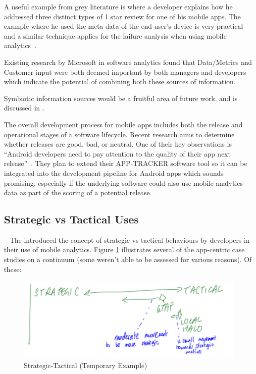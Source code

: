 A useful example from grey literature is where a developer explains how he addressed three distinct types of 1 star review for one of his mobile apps. The example where he used the meta-data of the end user's device is very practical and a similar technique applies for the failure analysis when using mobile analytics~.

Existing research by Microsoft in software analytics found that Data/Metrics and Customer input were both deemed important by both managers and developers which indicate the potential of combining both these sources of information.~

Symbiotic information sources would be a fruitful area of future work, and is discussed in .

The overall development process for mobile apps includes both the release and operational stages of a software lifecycle. Recent research aims to determine whether releases are good, bad, or neutral. One of their key observations is ``Android developers need to pay attention to the quality of their app next release''~. They plan to extend their \uppercase{App-Tracker} software tool so it can be integrated into the development pipeline for Android apps which sounds promising, especially if the underlying software could also use mobile analytics data as part of the scoring of a potential release.


\subsection{Strategic vs Tactical Uses}~\label{aiu-strategic-vs-tactical-uses-topic}
The  introduced the concept of strategic vs tactical behaviours by developers in their use of mobile analytics. Figure \ref{fig:aiu-strategic-tactical-example} illustrates several of the app-centric case studies on a continuum (some weren't able to be assessed for various reasons). Of these:

\begin{figure}
    \centering
    \includegraphics[width=\linewidth]{images/rough-sketches/aiu-strategic-tactical-example.pdf}
    \caption{Strategic-Tactical (Temporary Example)}
    \label{fig:aiu-strategic-tactical-example}
\end{figure}

